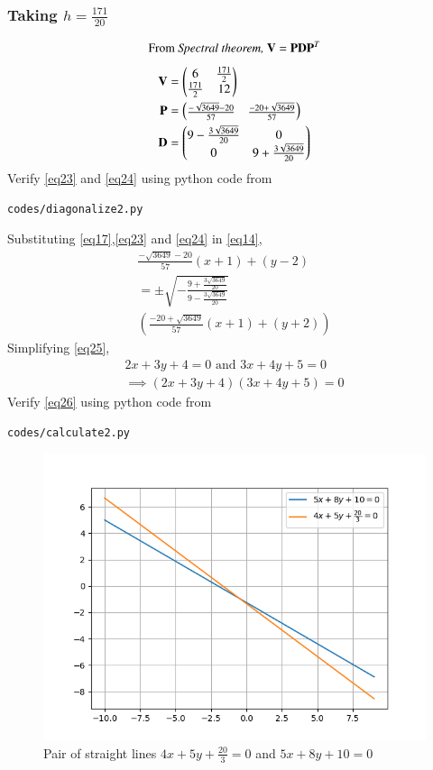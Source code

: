 \documentclass[journal,12pt,twocolumn]{IEEEtran}
\begin{document}
\subsubsection{Taking $h=\frac{171}{20}$}
\begin{equation}
	\text{From \textit{Spectral theorem, }} \vec{V} = \vec{P}\vec{D}\vec{P}^T
\end{equation}
\begin{align}
	\vec{V} &= \myvec{ 6 & \frac{171}{2}\\ \frac{171}{2} & 12}\\
	\label{eq23}\vec{P} &= \myvec{\frac{-\sqrt{3649} - 20}{57} & \frac{-20 + \sqrt{3649}}{57}}\\
	\label{eq24}\vec{D} &= \myvec{9 - \frac{3\sqrt{3649}}{20} & 0\\ 0 & 9 + \frac{3\sqrt{3649}}{20}}
\end{align}
Verify  \eqref{eq23} and \eqref{eq24} using python code from
\begin{lstlisting}
codes/diagonalize2.py
\end{lstlisting}
Substituting \eqref{eq17},\eqref{eq23} and \eqref{eq24} in \eqref{eq14}, 
\begin{multline}\label{eq25}
	\frac{-\sqrt{3649} - 20}{57}(x+1) + (y-2) \\= \pm 
	\sqrt{-\frac{9 + \frac{3\sqrt{3649}}{20}}{9 - \frac{3\sqrt{3649}}{20}}}\\
	\left(\frac{-20 + \sqrt{3649}}{57}(x+1) + (y+2)\right)
\end{multline}
Simplifying \eqref{eq25},
\begin{align}
	\label{eq26}2x + 3y + 4 = 0 \text{ and } 3x + 4y + 5 = 0\\
	\label{eq27}\implies (2x + 3y + 4)(3x + 4y + 5) = 0
\end{align}
Verify  \eqref{eq26} using python code from
\begin{lstlisting}
codes/calculate2.py
\end{lstlisting}
\renewcommand{\thefigure}{2}
\begin{figure}[h]
	\centering
	\includegraphics[width=\columnwidth]{fig/figure_2.png}
	\caption{Pair of straight lines $4x + 5y + \frac{20}{3} = 0$ and $5x + 8y + 10 = 0$}
	\label{fig:figure2}
\end{figure}
\end{document}
